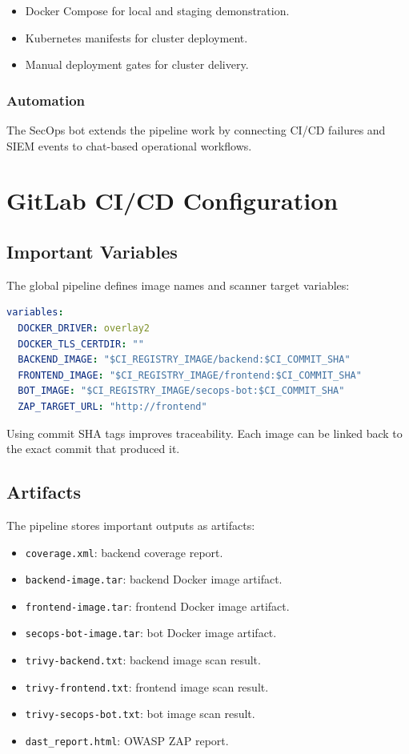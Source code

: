 \documentclass[12pt,a4paper]{report}
\begin{document}
\begin{itemize}[leftmargin=*]
    \item Docker Compose for local and staging demonstration.
    \item Kubernetes manifests for cluster deployment.
    \item Manual deployment gates for cluster delivery.
\end{itemize}

\subsection{Automation}

The SecOps bot extends the pipeline work by connecting CI/CD failures and SIEM events to chat-based operational workflows.

\chapter{GitLab CI/CD Configuration}

\section{Important Variables}

The global pipeline defines image names and scanner target variables:

\begin{lstlisting}[language=yaml,caption={Pipeline variables}]
variables:
  DOCKER_DRIVER: overlay2
  DOCKER_TLS_CERTDIR: ""
  BACKEND_IMAGE: "$CI_REGISTRY_IMAGE/backend:$CI_COMMIT_SHA"
  FRONTEND_IMAGE: "$CI_REGISTRY_IMAGE/frontend:$CI_COMMIT_SHA"
  BOT_IMAGE: "$CI_REGISTRY_IMAGE/secops-bot:$CI_COMMIT_SHA"
  ZAP_TARGET_URL: "http://frontend"
\end{lstlisting}

Using commit SHA tags improves traceability. Each image can be linked back to the exact commit that produced it.

\section{Artifacts}

The pipeline stores important outputs as artifacts:

\begin{itemize}[leftmargin=*]
    \item \texttt{coverage.xml}: backend coverage report.
    \item \texttt{backend-image.tar}: backend Docker image artifact.
    \item \texttt{frontend-image.tar}: frontend Docker image artifact.
    \item \texttt{secops-bot-image.tar}: bot Docker image artifact.
    \item \texttt{trivy-backend.txt}: backend image scan result.
    \item \texttt{trivy-frontend.txt}: frontend image scan result.
    \item \texttt{trivy-secops-bot.txt}: bot image scan result.
    \item \texttt{dast\_report.html}: OWASP ZAP report.
\end{itemize}
\end{document}
